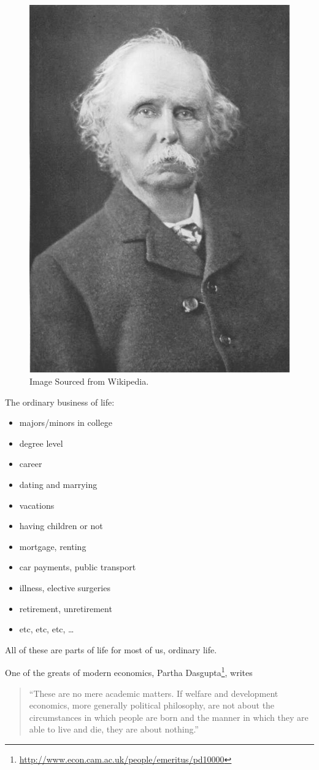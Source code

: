 \documentclass[
]{book}
\providecommand{\tightlist}{%
  \setlength{\itemsep}{0pt}\setlength{\parskip}{0pt}}
\begin{document}
\begin{figure}

{\centering \includegraphics[width=0.5\linewidth]{img/intro/Alfred_Marshall} 

}

\caption{Image Sourced from Wikipedia.}\label{fig:intro02}
\end{figure}

The ordinary business of life:

\begin{itemize}
\tightlist
\item
  majors/minors in college
\item
  degree level
\item
  career
\item
  dating and marrying
\item
  vacations
\item
  having children or not
\item
  mortgage, renting
\item
  car payments, public transport
\item
  illness, elective surgeries
\item
  retirement, unretirement
\item
  etc, etc, etc, \ldots{}
\end{itemize}

All of these are parts of life for most of us, ordinary life.

One of the greats of modern economics, Partha Dasgupta\footnote{\url{http://www.econ.cam.ac.uk/people/emeritus/pd10000}}, writes

\begin{quote}
``These are no mere academic matters. If welfare and development economics, more generally political philosophy, are not about the circumstances in which people are born and the manner in which they are able to live and die, they are about nothing.''
\end{quote}
\end{document}
